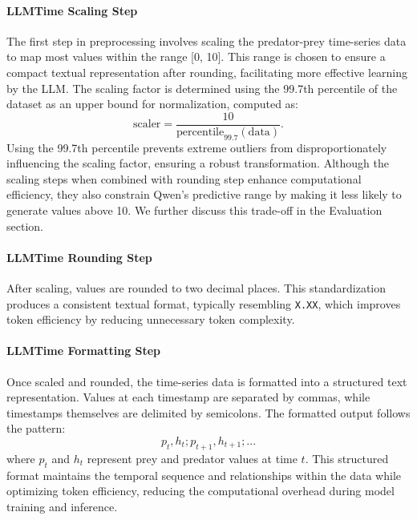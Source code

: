 \documentclass{article}
\begin{document}
\paragraph{LLMTime Scaling Step}
The first step in preprocessing involves scaling the predator-prey time-series data to map most values within the range [0, 10]. This range is chosen to ensure a compact textual representation after rounding, facilitating more effective learning by the LLM. The scaling factor is determined using the 99.7th percentile of the dataset as an upper bound for normalization, computed as:
\begin{equation}
    \text{scaler} = \frac{10}{\text{percentile}_{99.7}(\text{data})}.
    \label{eq:scaling_factor}
\end{equation}
Using the 99.7th percentile prevents extreme outliers from disproportionately influencing the scaling factor, ensuring a robust transformation. Although the scaling steps when combined with rounding step enhance computational efficiency, they also constrain Qwen’s predictive range by making it less likely to generate values above 10. We further discuss this trade-off in the Evaluation section.


\paragraph{LLMTime Rounding Step}
After scaling, values are rounded to two decimal places. This standardization produces a consistent textual format, typically resembling \texttt{X.XX}, which improves token efficiency by reducing unnecessary token complexity. 



\paragraph{LLMTime Formatting Step}
Once scaled and rounded, the time-series data is formatted into a structured text representation. Values at each timestamp are separated by commas, while timestamps themselves are delimited by semicolons. The formatted output follows the pattern:
\begin{equation}
    p_t, h_t ; p_{t+1}, h_{t+1} ; ...
\end{equation}
where $p_t$ and $h_t$ represent prey and predator values at time $t$. This structured format maintains the temporal sequence and relationships within the data while optimizing token efficiency, reducing the computational overhead during model training and inference.
\end{document}
